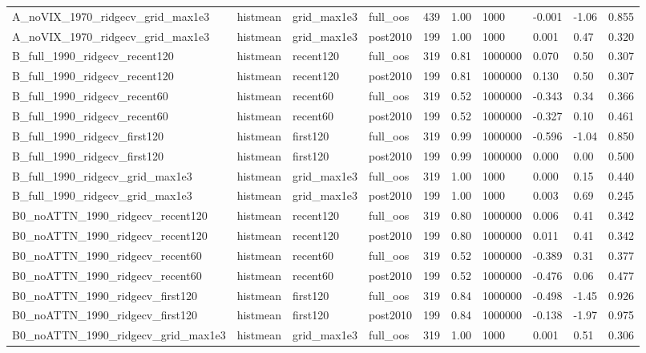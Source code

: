 \begin{table}
\begin{tabular}{llllrlllll}
A\_noVIX\_1970\_ridgecv\_grid\_max1e3 & histmean & grid\_max1e3 & full\_oos & 439 & 1.00 & 1000 & -0.001 & -1.06 & 0.855 \\
A\_noVIX\_1970\_ridgecv\_grid\_max1e3 & histmean & grid\_max1e3 & post2010 & 199 & 1.00 & 1000 & 0.001 & 0.47 & 0.320 \\
B\_full\_1990\_ridgecv\_recent120 & histmean & recent120 & full\_oos & 319 & 0.81 & 1000000 & 0.070 & 0.50 & 0.307 \\
B\_full\_1990\_ridgecv\_recent120 & histmean & recent120 & post2010 & 199 & 0.81 & 1000000 & 0.130 & 0.50 & 0.307 \\
B\_full\_1990\_ridgecv\_recent60 & histmean & recent60 & full\_oos & 319 & 0.52 & 1000000 & -0.343 & 0.34 & 0.366 \\
B\_full\_1990\_ridgecv\_recent60 & histmean & recent60 & post2010 & 199 & 0.52 & 1000000 & -0.327 & 0.10 & 0.461 \\
B\_full\_1990\_ridgecv\_first120 & histmean & first120 & full\_oos & 319 & 0.99 & 1000000 & -0.596 & -1.04 & 0.850 \\
B\_full\_1990\_ridgecv\_first120 & histmean & first120 & post2010 & 199 & 0.99 & 1000000 & 0.000 & 0.00 & 0.500 \\
B\_full\_1990\_ridgecv\_grid\_max1e3 & histmean & grid\_max1e3 & full\_oos & 319 & 1.00 & 1000 & 0.000 & 0.15 & 0.440 \\
B\_full\_1990\_ridgecv\_grid\_max1e3 & histmean & grid\_max1e3 & post2010 & 199 & 1.00 & 1000 & 0.003 & 0.69 & 0.245 \\
B0\_noATTN\_1990\_ridgecv\_recent120 & histmean & recent120 & full\_oos & 319 & 0.80 & 1000000 & 0.006 & 0.41 & 0.342 \\
B0\_noATTN\_1990\_ridgecv\_recent120 & histmean & recent120 & post2010 & 199 & 0.80 & 1000000 & 0.011 & 0.41 & 0.342 \\
B0\_noATTN\_1990\_ridgecv\_recent60 & histmean & recent60 & full\_oos & 319 & 0.52 & 1000000 & -0.389 & 0.31 & 0.377 \\
B0\_noATTN\_1990\_ridgecv\_recent60 & histmean & recent60 & post2010 & 199 & 0.52 & 1000000 & -0.476 & 0.06 & 0.477 \\
B0\_noATTN\_1990\_ridgecv\_first120 & histmean & first120 & full\_oos & 319 & 0.84 & 1000000 & -0.498 & -1.45 & 0.926 \\
B0\_noATTN\_1990\_ridgecv\_first120 & histmean & first120 & post2010 & 199 & 0.84 & 1000000 & -0.138 & -1.97 & 0.975 \\
B0\_noATTN\_1990\_ridgecv\_grid\_max1e3 & histmean & grid\_max1e3 & full\_oos & 319 & 1.00 & 1000 & 0.001 & 0.51 & 0.306 \\

\end{tabular}
\end{table}
